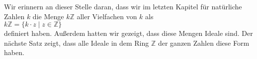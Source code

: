 

Wir erinnern an dieser Stelle daran, dass wir im letzten Kapitel für natürliche Zahlen $k$
die Menge $k\mathbb{Z}$ aller Vielfachen von $k$ als
\\[0.2cm]
\hspace*{1.3cm}
$k\mathbb{Z} = \{ k \cdot z \mid z \in \mathbb{Z} \}$
\\[0.2cm]
definiert haben.  Außerdem hatten wir gezeigt, dass diese Mengen Ideale sind.
Der nächste Satz zeigt, dass alle Ideale in dem Ring $\mathbb{Z}$ der ganzen Zahlen
diese Form haben.

